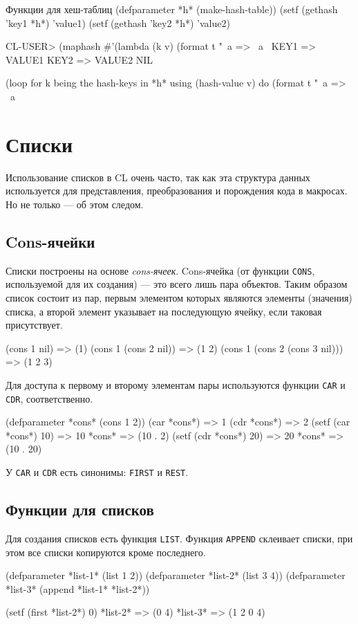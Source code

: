 \begin{cllst}{Функции для хеш-таблиц}{}
(defparameter *h* (make-hash-table))
(setf (gethash 'key1 *h*) 'value1)
(setf (gethash 'key2 *h*) 'value2)

CL-USER> (maphash #'(lambda (k v) (format t "~a => ~a~%
KEY1 => VALUE1
KEY2 => VALUE2
NIL

(loop for k being the hash-keys in *h* using (hash-value v)
  do (format t "~a => ~a~%
\end{cllst}

\section{Списки}
Использование списков в CL очень часто, так как эта структура данных используется для представления, преобразования и порождения кода в макросах. Но не только — об этом следом.

\subsection{Cons-ячейки}
Списки построены на основе \emph{cons-ячеек}. Cons-ячейка (от функции \lstinline{CONS}, используемой для их создания) — это всего лишь пара объектов. Таким образом список состоит из пар, первым элементом которых являются элементы (значения) списка, а второй элемент указывает на последующую ячейку, если таковая присутствует.
\begin{cllst}{}{}
(cons 1 nil)                   => (1)
(cons 1 (cons 2 nil))          => (1 2)
(cons 1 (cons 2 (cons 3 nil))) => (1 2 3)
\end{cllst}

Для доступа к первому и второму элементам пары используются функции \lstinline{CAR} и \lstinline{CDR}, соответственно.
\begin{cllst}{}{}
(defparameter *cons* (cons 1 2))
(car *cons*)           => 1
(cdr *cons*)           => 2
(setf (car *cons*) 10) => 10
*cons*                 => (10 . 2)
(setf (cdr *cons*) 20) => 20
*cons*                 => (10 . 20)
\end{cllst}

У \lstinline{CAR} и \lstinline{CDR} есть синонимы: \lstinline{FIRST} и \lstinline{REST}.

\subsection{Функции для списков}

Для создания списков есть функция \lstinline{LIST}. Функция \lstinline{APPEND} склеивает списки, при этом все списки копируются кроме последнего.
\begin{cllst}{}{}
(defparameter *list-1* (list 1 2))
(defparameter *list-2* (list 3 4))
(defparameter *list-3* (append *list-1* *list-2*))

(setf (first *list-2*) 0)
*list-2*  => (0 4)
*list-3*  => (1 2 0 4)
\end{cllst}

